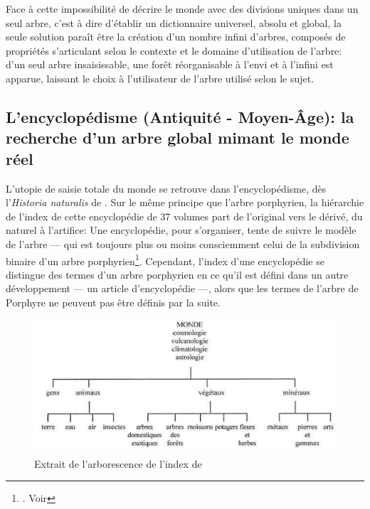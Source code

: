 Face à cette impossibilité de décrire le monde avec des divisions uniques dans un seul arbre, c'est à dire d'établir un dictionnaire universel, absolu et global, la seule solution paraît être la création d'un nombre infini d'arbres, composés de propriétés s'articulant selon le contexte et le domaine d'utilisation de l'arbre: d'un seul arbre insaisissable, une forêt réorganisable à l'envi et à l'infini est apparue, laissant le choix à l'utilisateur de l'arbre utilisé selon le sujet.

\subsection{\label{I-C-1-b}L'encyclopédisme (Antiquité - Moyen-Âge): la recherche d'un arbre global mimant le monde réel}

L'utopie de saisie totale du monde se retrouve dans l'encyclopédisme, dès l'\textit{Historia naturalis} de . Sur le même principe que l'arbre porphyrien, la hiérarchie de l'index de cette encyclopédie de 37 volumes part de l'original vers le dérivé, du naturel à l'artifice: \og Une encyclopédie, pour s’organiser, tente de suivre le modèle de l’arbre --- qui est toujours plus ou moins consciemment celui de la subdivision binaire d’un arbre porphyrien\fg{}\footnote{\cite[chap.1]{eco_arbre_2010}. Voir }. Cependant, l'index d'une encyclopédie se distingue des termes d'un arbre porphyrien en ce qu'il est défini dans un autre développement --- un article d'encyclopédie ---, alors que les termes de l'arbre de Porphyre ne peuvent pas être définis par la suite.

\begin{figure}[!h]
	\centering
	\includegraphics[width= 13cm]{images/index_pline.png}
	\caption{Extrait de l'arborescence de l'index de }
	\label{index_pline}
\end{figure}

